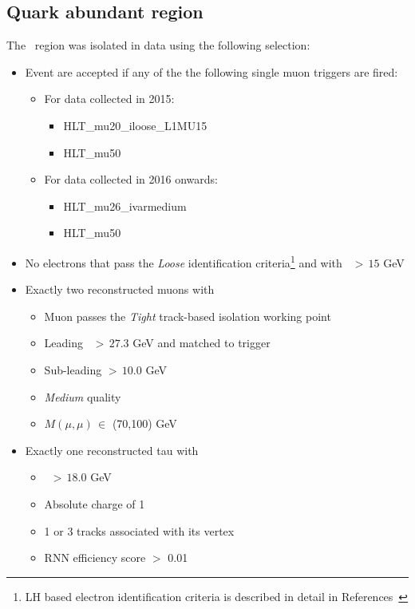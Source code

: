	 
	\subsection{Quark abundant region}\label{subsec:quarkregion}	
	The \Zjets\ region was isolated in data using the following selection:
	\begin{itemize}
	\item Event are accepted if any of the the following single muon triggers are fired: 
		\begin{itemize}
		\item For data collected in 2015:
			\begin{itemize}
				\item HLT\_mu20\_iloose\_L1MU15
				\item HLT\_mu50
			\end{itemize}
		\item For data collected in 2016 onwards:
			\begin{itemize}
				\item HLT\_mu26\_ivarmedium
				\item HLT\_mu50
			\end{itemize}
		\end{itemize}
	\item No electrons that pass the \textit{Loose} identification criteria\footnote{\ac{LH} based electron identification criteria is described in detail in References~\cite{ele_id,Aad_2019}} and with \pt\ $>\,15$ GeV
	\item Exactly two reconstructed muons with
	\begin{itemize}
		\item Muon passes the \textit{Tight} track-based isolation working point~\cite{cite-key}
		\item Leading \pt\ $>\,27.3$ GeV and matched to trigger
		\item Sub-leading \pt $>\,10.0$ GeV 
		\item \textit{Medium} quality~\cite{cite-key}
		\item $M(\mu,\mu)\,\in$ (70,100) GeV
	\end{itemize}
	\item Exactly one reconstructed tau with
	\begin{itemize}
		\item \pt\ $>\,18.0$ GeV
		\item Absolute charge of 1 
		\item 1 or 3 tracks associated with its vertex
		\item \ac{RNN} efficiency score $>$ 0.01
	\end{itemize}
	\end{itemize}
	
